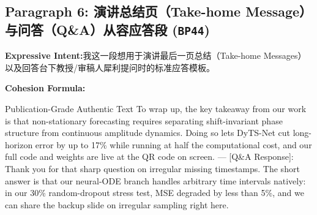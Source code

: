 \subsection*{Paragraph 6: 演讲总结页（Take-home Message）与问答（Q\&A）从容应答段 (\texttt{BP44})}
\noindent\textbf{Expressive Intent:}\enspace 我这一段想用于演讲最后一页总结（Take-home Messages）以及回答台下教授/审稿人犀利提问时的标准应答模板。\par
\noindent\textbf{Cohesion Formula:}\par\vspace{4pt}
\begin{ExampleBox}{Publication-Grade Authentic Text}
To wrap up, the key takeaway from our work is that non-stationary forecasting requires separating shift-invariant phase structure from continuous amplitude dynamics. Doing so lets DyTS-Net cut long-horizon error by up to 17\% while running at half the computational cost, and our full code and weights are live at the QR code on screen. --- [Q\&A Response]: Thank you for that sharp question on irregular missing timestamps. The short answer is that our neural-ODE branch handles arbitrary time intervals natively: in our 30\% random-dropout stress test, MSE degraded by less than 5\%, and we can share the backup slide on irregular sampling right here.
\end{ExampleBox}
